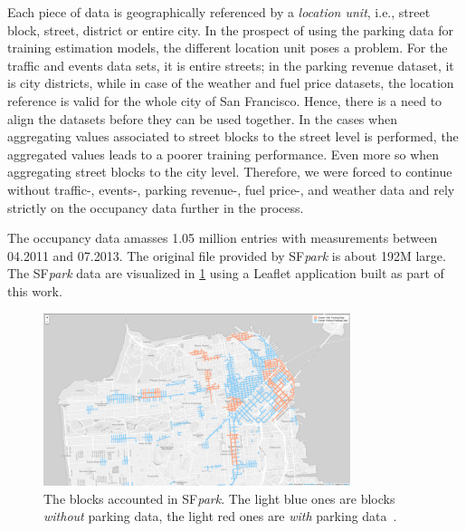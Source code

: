 	Each piece of data is geographically referenced by a \textit{location unit}, i.e., street block, street, district or entire city. In the prospect of using the parking data for training estimation models, the different location unit poses a problem. For the traffic and events data sets, it is entire streets; in the parking revenue dataset, it is city districts, while in case of the weather and fuel price datasets, the location reference is valid for the whole city of San Francisco. Hence, there is a need to align the datasets before they can be used together. In the cases when aggregating values associated to street blocks to the street level is performed, the aggregated values leads to a poorer training performance. Even more so when aggregating street blocks to the city level. Therefore, we were forced to continue without traffic-, events-, parking revenue-, fuel price-, and weather data and rely strictly on the occupancy data further in the process.
	
	The occupancy data amasses 1.05 million entries with measurements between 04.2011 and 07.2013. The original file provided by SF\textit{park} is about 192M large. The SF\textit{park} data are visualized in \cref{fig:before_clustering} using a Leaflet application built as part of this work.
	
	\begin{figure}[!ht]
		\centering
		\includegraphics[width=0.8\textwidth]{graphics/initial_view_before_clusteringV7.png}
		\caption{The blocks accounted in SF\textit{park}. The light blue ones are blocks \textit{without} parking data, the light red ones are \textit{with} parking data~\protect\cite{web_application}.}
		\label{fig:before_clustering}
	\end{figure}
		
